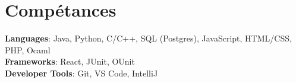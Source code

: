 \documentclass[letterpaper,11pt]{article}
\begin{document}
\section{Compétances}
 \begin{itemize}[leftmargin=0.15in, label={}]
    \small{\item{
     \textbf{Languages}{: Java, Python, C/C++, SQL (Postgres), JavaScript, HTML/CSS, PHP, Ocaml} \\
     \textbf{Frameworks}{: React, JUnit, OUnit} \\
     \textbf{Developer Tools}{: Git, VS Code, IntelliJ} \\
    }}
 \end{itemize}


\end{document}
